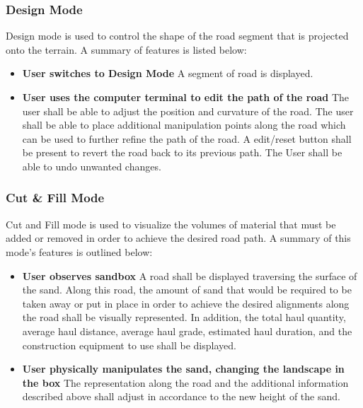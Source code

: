 \documentclass[onecolumn, draftclsnofoot,10pt, compsoc]{IEEEtran}
\begin{document}
\subsubsection{Design Mode}
Design mode is used to control the shape of the road segment that is projected onto the terrain. A summary of features is listed below:

\begin{itemize}
\item \textbf{User switches to Design Mode}
A segment of road is displayed.

\item \textbf{User uses the computer terminal to edit the path of the road}
The user shall be able to adjust the position and curvature of the road.
The user shall be able to place additional manipulation points along the road which can be used to further refine the path of the road.
A edit/reset button shall be present to revert the road back to its previous path.
The User shall be able to undo unwanted changes.

\end{itemize}

\subsubsection{Cut \& Fill Mode}
Cut and Fill mode is used to visualize the volumes of material that must be added or removed in order to achieve the desired road path. A summary of this mode's features is outlined below:

\begin{itemize}
\item \textbf{User observes sandbox}
A road shall be displayed traversing the surface of the sand.  Along this road, the amount of sand that would be required to be taken away or put in place in order to achieve the desired alignments along the road shall be visually represented.  In addition, the total haul quantity, average haul distance, average haul grade, estimated haul duration, and the construction equipment to use shall be displayed.

\item \textbf{User physically manipulates the sand, changing the landscape in the box}
The representation along the road and the additional information described above shall adjust in accordance to the new height of the sand.

\end{itemize}
\end{document}
